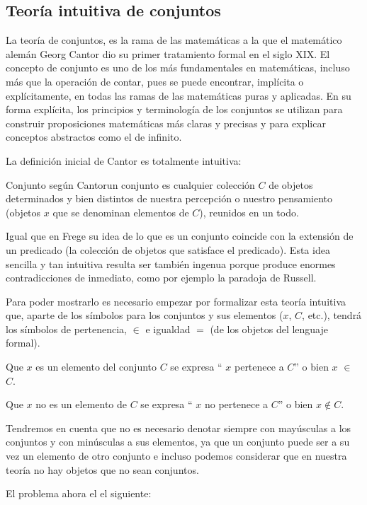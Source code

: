 \subsection{Teoría intuitiva de conjuntos }

La \textsf{teoría de conjuntos}, es la rama de las matemáticas a la
que el matemático alemán Georg Cantor dio su primer tratamiento formal
en el siglo XIX. El concepto de conjunto es uno de los más fundamentales
en matemáticas, incluso más que la operación de contar, pues se puede
encontrar, implícita o explícitamente, en todas las ramas de las matemáticas
puras y aplicadas. En su forma explícita, los principios y terminología
de los conjuntos se utilizan para construir proposiciones matemáticas
más claras y precisas y para explicar conceptos abstractos como el
de infinito.

La definición inicial de Cantor es totalmente intuitiva: 

\begin{defi}{Conjunto según Cantor}{}un conjunto es cualquier colección
$C$ de objetos determinados y bien distintos de nuestra percepción
o nuestro pensamiento (objetos $x$ que se denominan elementos de
$C$), reunidos en un todo.\end{defi}

Igual que en Frege su idea de lo que es un conjunto coincide con la
extensión de un predicado (la colección de objetos que satisface el
predicado). Esta idea sencilla y tan intuitiva resulta ser también
ingenua porque produce enormes contradicciones de inmediato, como
por ejemplo la paradoja de Russell.

Para poder mostrarlo es necesario empezar por formalizar esta teoría
intuitiva que, aparte de los símbolos para los conjuntos y sus elementos
($x$, $C$, etc.), tendrá los símbolos de pertenencia, $\in$ e igualdad
$=$ (de los objetos del lenguaje formal). 

Que $x$ es un elemento del conjunto $C$ se expresa `` $x$ pertenece
a $C$'' o bien $x$ $\in$ $C$. 

Que $x$ no es un elemento de $C$ se expresa `` $x$ no pertenece
a $C$'' o bien $x\notin C$. 

Tendremos en cuenta que no es necesario denotar siempre con mayúsculas
a los conjuntos y con minúsculas a sus elementos, ya que un conjunto
puede ser a su vez un elemento de otro conjunto e incluso podemos
considerar que en nuestra teoría no hay objetos que no sean conjuntos.

El problema ahora el el siguiente:

